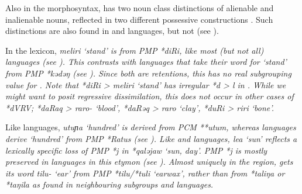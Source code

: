Also in the morphosyntax,
 has two noun class distinctions of alienable
and inalienable nouns, reflected in two different possessive
constructions \citep[535f]{CollinsKaartinen1998}.
Such distinctions are also found in 
and  languages, but not  (see ).

In the lexicon,  \it{meliri} ‘stand’ is from PMP *diRi,
like most (but not all)  languages (see ).
This contrasts with  languages that take their
word for ‘stand’ from PMP *kədəŋ (see ).
Since both are retentions,
this has no real subgrouping value for .
Note that  *diRi > \it{meliri} ‘stand’ has irregular *d
> \it{l} in .
While we might want to posit regressive dissimilation,
this does not occur in other cases of *dVRV; *daRaq
> \it{raro-} ‘blood’, *daRəq > \it{raro} ‘clay’,
*duRi > \it{riri} ‘bone’.

Like  languages,  \it{utuɲa} ‘hundred’
is derived from PCM **utum,
whereas  languages derive ‘hundred’
from PMP *Ratus (see ).
Like  and  languages,  \it{lea}
‘sun’ reflects a lexically specific loss of PMP *j in *qaləjaw ‘sun, day’.
PMP *j is mostly preserved in  languages
in this etymon (see ).
Almost uniquely in the region,
 gets its word \it{tilu-} ‘ear’ from PMP *tilu/*tuli ‘earwax’,
rather than from *taliŋa or *taŋila as found
in neighbouring subgroups and languages.






